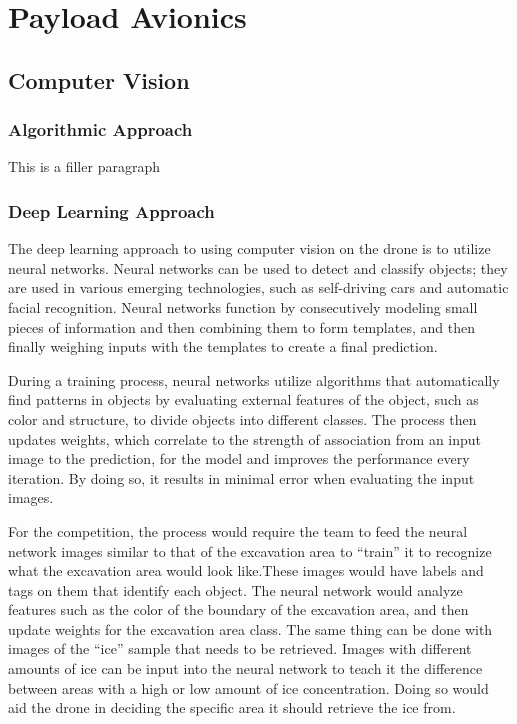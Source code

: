 \section{Payload Avionics}\label{PL:Tradeoffs:Avionics}
	\subsection{Computer Vision}
		\subsubsection{Algorithmic Approach}
			This is a filler paragraph

		\subsubsection{Deep Learning Approach}
			The deep learning approach to using computer vision on the drone is to utilize neural networks. Neural networks can be used to detect and classify objects; they are used in various emerging technologies, such as self-driving cars and automatic facial recognition. 
			Neural networks function by consecutively modeling small pieces of information and then combining them to form templates, and then finally weighing inputs with the templates to create a final prediction.
		
			During a training process, neural networks utilize algorithms that automatically find patterns in objects by evaluating external features of the object, such as color and structure, to divide objects into different classes. The process then updates weights, which correlate to the strength of association from an input image to the prediction, for the model and improves the performance every iteration. By doing so, it results in minimal error when evaluating the input images.
		
			For the competition, the process would require the team to feed the neural network images similar to that of the excavation area to “train” it to recognize what the excavation area would look like.These images would have labels and tags on them that identify each object. The neural network would analyze features such as the color of the boundary of the excavation area, and then update weights for the excavation area class. The same thing can be done with images of the “ice” sample that needs to be retrieved. Images with different amounts of ice can be input into the neural network to teach it the difference between areas with a high or low amount of ice concentration. Doing so would aid the drone in deciding the specific area it should retrieve the ice from.
		

